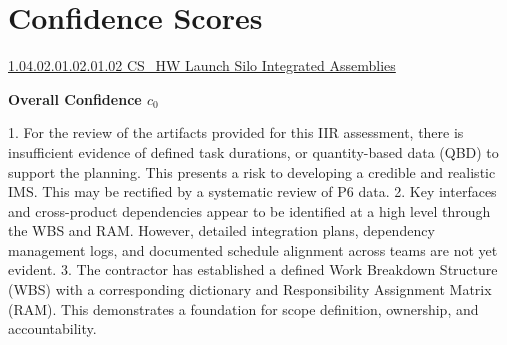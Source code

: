 % 

\section{Confidence Scores}
\begin{frame}{\href{run:../local/source-docs/1.04.02.01.02.01.02.pdf}{1.04.02.01.02.01.02 CS\_HW Launch Silo Integrated Assemblies}}
\centering
{}
\par
\vspace{0.75em}
\textbf{\small{Overall Confidence $c_{0}$}}\\\par
\vspace{0.5em}
\begin{minipage}{0.85\textwidth}
\linespread{0.65}\selectfont
{\tiny{1. For the review of the artifacts provided for this IIR assessment, there is insufficient evidence of defined task durations, or quantity-based data (QBD) to support the planning. This presents a risk to developing a credible and realistic IMS. This may be rectified by a systematic review of P6 data. 2. Key interfaces and cross-product dependencies appear to be identified at a high level through the WBS and RAM. However, detailed integration plans, dependency management logs, and documented schedule alignment across teams are not yet evident. 3. The contractor has established a defined Work Breakdown Structure (WBS) with a corresponding dictionary and Responsibility Assignment Matrix (RAM). This demonstrates a foundation for scope definition, ownership, and accountability.}}
\end{minipage}
\end{frame}
%
